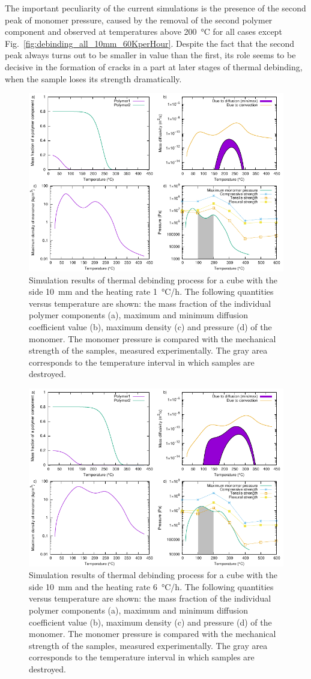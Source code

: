 \documentclass{article}
\newcommand{\ResultsCaption}[2]{
    Simulation results of thermal debinding process for a cube
    with the side \SI{#1}{\mm} and the heating rate \SI{#2}{\celsius/\hour}.
    The following quantities versus temperature are shown:
    the mass fraction of the individual polymer components (a),
    maximum and minimum diffusion coefficient value (b),
    maximum density (c) and pressure (d) of the monomer.
    The monomer pressure is compared with the mechanical strength of the samples,
    measured experimentally.
    The gray area corresponds to the temperature interval in which samples are destroyed.
}
\begin{document}
The important peculiarity of the current simulations is the presence of the second peak
of monomer pressure, caused by the removal of the second polymer component
and observed at temperatures above \SI{200}{\celsius} for all cases
except Fig.~\ref{fig:debinding_all_10mm_60KperHour}.
Despite the fact that the second peak always turns out to be smaller in value than the first,
its role seems to be decisive in the formation of cracks in a part at later stages of thermal debinding,
when the sample loses its strength dramatically.

\begin{figure}
    \centering
    \includegraphics[width=\textwidth]{debinding_all_10mm_1KperHour}
    \caption{\ResultsCaption{10}{1}}
    \label{fig:debinding_all_10mm_1KperHour}
\end{figure}

\begin{figure}
    \centering
    \includegraphics[width=\textwidth]{debinding_all_10mm_6KperHour}
    \caption{\ResultsCaption{10}{6}}
    \label{fig:debinding_all_10mm_6KperHour}
\end{figure}
\end{document}
